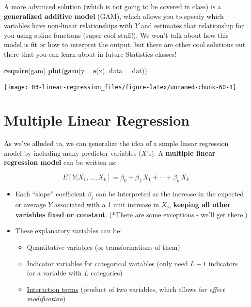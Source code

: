 \documentclass[
]{book}
\newenvironment{Shaded}{\begin{snugshade}}{\end{snugshade}}
\newcommand{\DataTypeTok}[1]{\textcolor[rgb]{0.13,0.29,0.53}{#1}}
\newcommand{\KeywordTok}[1]{\textcolor[rgb]{0.13,0.29,0.53}{\textbf{#1}}}
\newcommand{\NormalTok}[1]{#1}
\newcommand{\OperatorTok}[1]{\textcolor[rgb]{0.81,0.36,0.00}{\textbf{#1}}}
\newcommand{\StringTok}[1]{\textcolor[rgb]{0.31,0.60,0.02}{#1}}
\providecommand{\tightlist}{%
  \setlength{\itemsep}{0pt}\setlength{\parskip}{0pt}}
\begin{document}
A more advanced solution (which is not going to be covered in class) is a \textbf{generalized additive model} (GAM), which allows you to specify which variables have non-linear relationships with \(Y\) and estimates that relationship for you using spline functions (super cool stuff!). We won't talk about how this model is fit or how to interpret the output, but there are other cool solutions out there that you can learn about in future Statistics classes!

\begin{Shaded}
\begin{Highlighting}[]
\KeywordTok{require}\NormalTok{(gam)}
\KeywordTok{plot}\NormalTok{(}\KeywordTok{gam}\NormalTok{(y }\OperatorTok{~}\StringTok{ }\KeywordTok{s}\NormalTok{(x), }\DataTypeTok{data =}\NormalTok{ dat))}
\end{Highlighting}
\end{Shaded}

\begin{center}\texttt{[image: 03-linear-regression\_files/figure-latex/unnamed-chunk-60-1]} \end{center}

\hypertarget{multiple}{%
\section{Multiple Linear Regression}\label{multiple}}

As we've alluded to, we can generalize the idea of a simple linear regression model by including many predictor variables (\(X\)'s). A \textbf{multiple linear regression model} can be written as:

\[ E[Y |X_1,...,X_k ] = \beta_0 + \beta_1\,X_{1} + \cdots + \beta_k\,X_{k}  \]

\begin{itemize}
\item
  Each ``slope'' coefficient \(\beta_j\) can be interpreted as the increase in the expected or average \(Y\) associated with a 1 unit increase in \(X_j\), \textbf{keeping all other variables fixed or constant}. (*There are some exceptions - we'll get there.)
\item
  These explanatory variables can be:

  \begin{itemize}
  \tightlist
  \item
    Quantitative variables (or transformations of them)
  \item
    \protect\hyperlink{indicator-variables}{Indicator variables} for categorical variables (only need \(L-1\) indicators for a variable with \(L\) categories)
  \item
    \protect\hyperlink{interaction-variables}{Interaction terms} (product of two variables, which allows for \emph{effect modification})
  \end{itemize}
\end{itemize}
\end{document}
